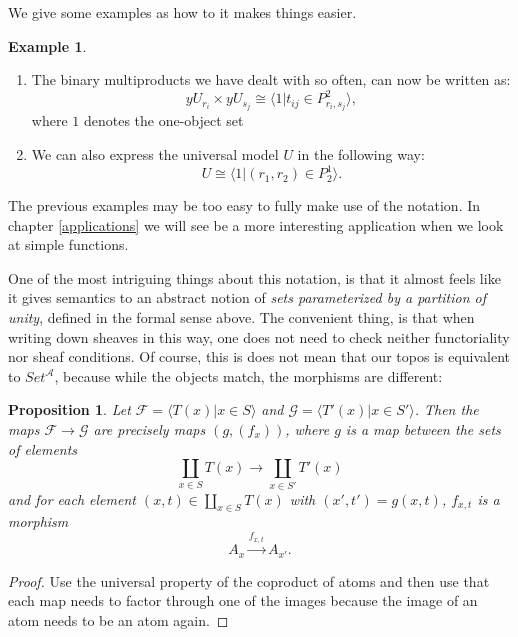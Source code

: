 \documentclass[a4paper]{amsproc}
\theoremstyle{plain}
\newtheorem{proposition}[theorem]{Proposition}
\theoremstyle{definition}
\newtheorem{example}[theorem]{Example}
\theoremstyle{remark}
\numberwithin{equation}{section}
\begin{document}
We give some examples as how to it makes things easier. 

\begin{example}
    \begin{enumerate}
        \item The binary multiproducts we have dealt with so often, can now be written as:
        \[ y U_{r_i} \times y U_{s_j} \cong \langle 1 | t_{ij} \in P^2_{r_i,s_j} \rangle, \] %
        where $1$ denotes the one-object set
        \item We can also express the universal model $U$ in the following way:
        \[ U \cong \langle 1 | (r_1,r_2) \in P^1_2 \rangle. \]
    \end{enumerate}
\end{example}

The previous examples may be too easy to fully make use of the notation. In chapter \ref{applications} we will see be a more interesting application when we look at simple functions.

One of the most intriguing things about this notation, is that it almost feels like it gives semantics to an abstract notion of \emph{sets parameterized by a partition of unity}, defined in the formal sense above. The convenient thing, is that when writing down sheaves in this way, one does not need to check neither functoriality nor sheaf conditions. Of course, this is does not mean that our topos is equivalent to $Set^{\mathcal{A}}$, because while the objects match, the morphisms are different:

\begin{proposition}\label{atom_coprod_maps}
    Let $\mathcal{F} = \langle T(x) | x \in S \rangle$ and $\mathcal{G} = \langle T'(x) | x \in S' \rangle $. Then the maps $\mathcal{F} \to \mathcal{G}$ are precisely maps $(g, (f_x))$, where $g$ is a map between the sets of elements
    \[
        \coprod_{x \in S} T(x) \to \coprod_{x \in S'} T'(x)
    \]
    and for each element $(x,t) \in \coprod_{x \in S} T(x)$ with $(x',t') = g(x,t)$, $f_{x,t}$ is a morphism
    \[
        A_x \xrightarrow{f_{x,t}} A_{x'} .
    \]
\end{proposition}
\begin{proof}
    Use the universal property of the coproduct of atoms and then use that each map needs to factor through one of the images because the image of an atom needs to be an atom again.
\end{proof}
\end{document}
